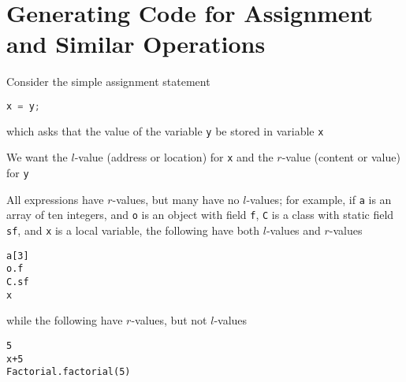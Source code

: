 \documentclass[8pt,a4paper,compress]{beamer}
\begin{document}
\section{Generating Code for Assignment and Similar Operations}
\begin{frame}[fragile]
\pause

Consider the simple assignment statement
\begin{lstlisting}[language=Java]
x = y;
\end{lstlisting}
which asks that the value of the variable \lstinline{y} be stored in variable \lstinline{x}

\pause
\bigskip

We want the $l$-value (address or location) for \lstinline{x} and the $r$-value (content or value) for \lstinline{y}

\pause
\bigskip

All expressions have $r$-values, but many have no $l$-values; for example, if \lstinline{a} is an array of ten integers, and \lstinline{o} is an object with field \lstinline{f}, \lstinline{C} is a class with static field \lstinline{sf}, and \lstinline{x} is a local variable, the following have both $l$-values and $r$-values 
\begin{lstlisting}[language={}]
a[3]
o.f
C.sf
x
\end{lstlisting}
while the following have $r$-values, but not $l$-values
\begin{lstlisting}[language={}]
5
x+5
Factorial.factorial(5)
\end{lstlisting}
\end{frame}
\end{document}
